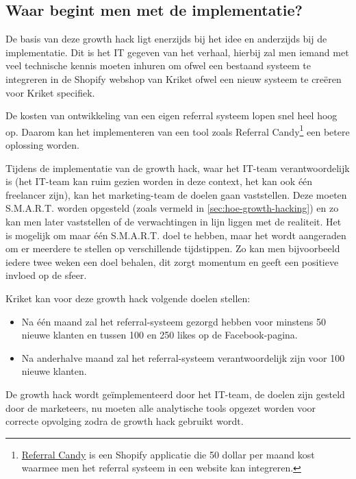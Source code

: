 \subsection{Waar begint men met de implementatie?}
\label{subsec:begin-implementatie}
De basis van deze growth hack ligt enerzijds bij het idee en anderzijds bij de implementatie. Dit is het IT gegeven van het verhaal, hierbij zal men iemand met veel technische kennis moeten inhuren om ofwel een bestaand systeem te integreren in de Shopify webshop van Kriket ofwel een nieuw systeem te creëren voor Kriket specifiek.

De kosten van ontwikkeling van een eigen referral systeem lopen snel heel hoog op. Daarom kan het implementeren van een tool zoals Referral Candy\footnote{\href{https://apps.shopify.com/referralcandy}{Referral Candy} is een Shopify applicatie die 50 dollar per maand kost waarmee men het referral systeem in een website kan integreren.} een betere oplossing worden. 

Tijdens de implementatie van de growth hack, waar het IT-team verantwoordelijk is (het IT-team kan ruim gezien worden in deze context, het kan ook één freelancer zijn), kan het marketing-team de doelen gaan vaststellen. Deze moeten S.M.A.R.T. worden opgesteld (zoals vermeld in \ref{sec:hoe-growth-hacking}) en zo kan men later vaststellen of de verwachtingen in lijn liggen met de realiteit. Het is mogelijk om maar één S.M.A.R.T. doel te hebben, maar het wordt aangeraden om er meerdere te stellen op verschillende tijdstippen. Zo kan men bijvoorbeeld iedere twee weken een doel behalen, dit zorgt momentum en geeft een positieve invloed op de sfeer.

Kriket kan voor deze growth hack volgende doelen stellen:
\begin{itemize}
	\item Na één maand zal het referral-systeem gezorgd hebben voor minstens 50 nieuwe klanten en tussen 100 en 250 likes op de Facebook-pagina.
	\item Na anderhalve maand zal het referral-systeem verantwoordelijk zijn voor 100 nieuwe klanten.
\end{itemize}

De growth hack wordt geïmplementeerd door het IT-team, de doelen zijn gesteld door de marketeers, nu moeten alle analytische tools opgezet worden voor correcte opvolging zodra de growth hack gebruikt wordt.

